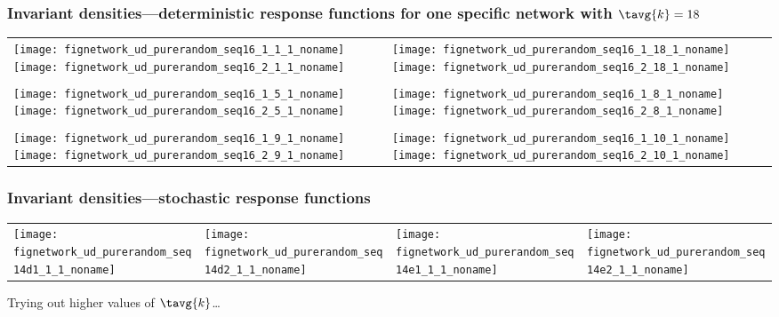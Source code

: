 \begin{frame}

  \frametitle{Invariant densities---deterministic response functions for one specific network with $\tavg{k}=18$}
  \begin{tabular}{ll}
    \texttt{[image: fignetwork\_ud\_purerandom\_seq16\_1\_1\_1\_noname]}%
    \texttt{[image: fignetwork\_ud\_purerandom\_seq16\_2\_1\_1\_noname]} &
    \qquad    \texttt{[image: fignetwork\_ud\_purerandom\_seq16\_1\_18\_1\_noname]}%
    \texttt{[image: fignetwork\_ud\_purerandom\_seq16\_2\_18\_1\_noname]} \\
    \\
    \texttt{[image: fignetwork\_ud\_purerandom\_seq16\_1\_5\_1\_noname]}%
    \texttt{[image: fignetwork\_ud\_purerandom\_seq16\_2\_5\_1\_noname]} &
    \qquad    \texttt{[image: fignetwork\_ud\_purerandom\_seq16\_1\_8\_1\_noname]}%
    \texttt{[image: fignetwork\_ud\_purerandom\_seq16\_2\_8\_1\_noname]} \\
    \\
    \texttt{[image: fignetwork\_ud\_purerandom\_seq16\_1\_9\_1\_noname]}%
    \texttt{[image: fignetwork\_ud\_purerandom\_seq16\_2\_9\_1\_noname]} &
    \qquad    \texttt{[image: fignetwork\_ud\_purerandom\_seq16\_1\_10\_1\_noname]}%
    \texttt{[image: fignetwork\_ud\_purerandom\_seq16\_2\_10\_1\_noname]} \\
  \end{tabular}


\end{frame}

\begin{frame}
  \frametitle{Invariant densities---stochastic response functions}
  \begin{tabular}{llll}
    \texttt{[image: fignetwork\_ud\_purerandom\_seq14d1\_1\_1\_noname]} &
    \texttt{[image: fignetwork\_ud\_purerandom\_seq14d2\_1\_1\_noname]} &
    \texttt{[image: fignetwork\_ud\_purerandom\_seq14e1\_1\_1\_noname]} &
    \texttt{[image: fignetwork\_ud\_purerandom\_seq14e2\_1\_1\_noname]} \\
  \end{tabular}
  Trying out higher values of $\tavg{k}$\ldots
        

\end{frame}

